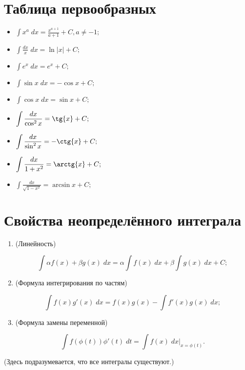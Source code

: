 	\section{Таблица первообразных}
	\begin{itemize}
		\item $\displaystyle\int x^a \; dx = \frac{x^{a + 1}}{a + 1} + C, a \neq -1;$
		\item $\displaystyle\int \frac{dx}{x} \; dx = \ln{|x|} + C;$
		\item $\displaystyle\int e^x \; dx = e^x + C;$
		\item $\displaystyle\int \sin{x} \; dx = -\cos{x} + C;$
		\item $\displaystyle\int \cos{x} \; dx = \sin{x} + C;$
		\item $\displaystyle\int \frac{dx}{\cos^2{x}} = \tg{x} + C;$
		\item $\displaystyle\int \frac{dx}{\sin^2{x}} = -\ctg{x} + C;$
		\item $\displaystyle\int \frac{dx}{1 + x^2} = \arctg{x} + C;$
		\item $\displaystyle\int \frac{dx}{\sqrt{1 - x^2}} = \arcsin{x} + C;$
	\end{itemize}
	
	\section{Свойства неопределённого интеграла}
	
	\begin{theorem}
		\begin{enumerate}
			\item (Линейность) 
			
			\[\int \alpha f(x) + \beta g(x) \; dx = \alpha \int f(x) \; dx + \beta \int g(x) \; dx + C;\]
			
			\item (Формула интегрирования по частям) 
			
			\[\int f(x)g'(x) \; dx = f(x)g(x) - \int f'(x)g(x) \; dx;\]
			
			\item (Формула замены переменной)
			
			\[\int f(\phi(t))\phi'(t) \; dt = \int f(x) \; dx\bigg|_{x=\phi(t)}.\]
			
		\end{enumerate}
		
	    (Здесь подразумевается, что все интегралы существуют.)
	\end{theorem}
	
